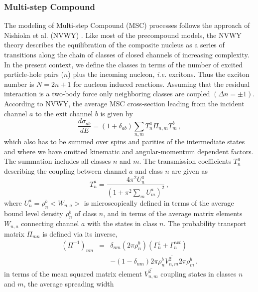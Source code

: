 \documentclass[twocolumn,amsmath,amssymb,10pt,groupedaddress,a4paper]{revtex4}
\begin{document}
\subsubsection{Multi-step Compound\label{sec: MSC}}
The modeling of Multi-step Compound (MSC)
processes follows the approach of Nishioka et al. (NVWY)
\cite{NVWY}. Like most of the precompound models, the NVWY theory
describes the equilibration of the composite nucleus as a series of
transitions along the chain of classes of closed channels of increasing
complexity. In the present context, we define the classes in terms
of the number of excited particle-hole pairs ($n$) plus the incoming
nucleon, {\it i.e.} excitons. Thus the exciton number is $N=2n+1$ for nucleon
induced reactions. Assuming that the residual interaction is a two-body
force only neighboring classes are coupled $(\Delta n=\pm1)$.
According to NVWY, the average MSC cross-section
leading from the incident channel $a$ to the exit channel $b$ is
given by
\begin{equation}
\frac{d\sigma_{ab}}{dE}=(1+\delta_{ab})\sum_{n,m}T_{n}^{a}\Pi_{n,m}T_{m}^{b}\,,
\label{msccs}
\end{equation}
which also has to be summed over spins and parities of the intermediate
states and where we have omitted kinematic and angular-momentum dependent
factors. The summation includes all classes $n$ and $m$. The transmission
coefficients $T_{n}^{a}$ describing the coupling between channel
$a$ and class $n$ are given as
\begin{equation}
T_{n}^{a}=\frac{4\pi^{2}U_{n}^{a}}{\left(1+\pi^{2}\sum_{m}U_{m}^{a}\right)^{2}}\,,
\label{TlMSC}
\end{equation}
\noindent where $U_{n}^{a}=\rho_{n}^{b}<W_{n,a}>$ is microscopically defined
in terms of the average bound level density
$\rho_{n}^{b}$ of class $n$, and in terms of the average matrix
elements $W_{n,a}$ connecting channel $a$ with the states in class
$n$. The probability transport matrix $\Pi_{mn}$ is defined via
its inverse,
\begin{eqnarray}
(\Pi^{-1})_{nm}&=&\delta_{nm}(2\pi\rho_{n}^{b})(\Gamma_{n}^{\downarrow}+\Gamma_{n}^{ext})\nonumber\\
&&-(1-\delta_{nm})2\pi\rho_{n}^{b}\overline{V_{n,m}^{2}}2\pi\rho_{m}^{b}\,.\label{Pi}
\end{eqnarray}
in terms of the mean squared matrix element $\overline{V_{n,m}^{2}}$
coupling states in classes $n$ and $m$, the average spreading width
\end{document}
